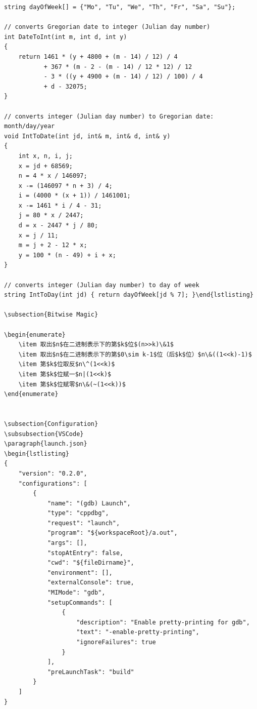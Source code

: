 \documentclass[twoside]{article}
\begin{document}
\begin{lstlisting}
string dayOfWeek[] = {"Mo", "Tu", "We", "Th", "Fr", "Sa", "Su"};

// converts Gregorian date to integer (Julian day number)
int DateToInt(int m, int d, int y)
{
    return 1461 * (y + 4800 + (m - 14) / 12) / 4
           + 367 * (m - 2 - (m - 14) / 12 * 12) / 12
           - 3 * ((y + 4900 + (m - 14) / 12) / 100) / 4
           + d - 32075;
}

// converts integer (Julian day number) to Gregorian date: month/day/year
void IntToDate(int jd, int& m, int& d, int& y)
{
    int x, n, i, j;
    x = jd + 68569;
    n = 4 * x / 146097;
    x -= (146097 * n + 3) / 4;
    i = (4000 * (x + 1)) / 1461001;
    x -= 1461 * i / 4 - 31;
    j = 80 * x / 2447;
    d = x - 2447 * j / 80;
    x = j / 11;
    m = j + 2 - 12 * x;
    y = 100 * (n - 49) + i + x;
}

// converts integer (Julian day number) to day of week
string IntToDay(int jd) { return dayOfWeek[jd % 7]; }\end{lstlisting}

\subsection{Bitwise Magic}

\begin{enumerate}
	\item 取出$n$在二进制表示下的第$k$位$(n>>k)\&1$
	\item 取出$n$在二进制表示下的第$0\sim k-1$位（后$k$位）$n\&((1<<k)-1)$
	\item 第$k$位取反$n\^(1<<k)$
	\item 第$k$位赋一$n|(1<<k)$
	\item 第$k$位赋零$n\&(~(1<<k))$
\end{enumerate}


\subsection{Configuration}
\subsubsection{VSCode}
\paragraph{launch.json}
\begin{lstlisting}
{
    "version": "0.2.0",
    "configurations": [
        {
            "name": "(gdb) Launch",
            "type": "cppdbg",
            "request": "launch",
            "program": "${workspaceRoot}/a.out",
            "args": [],
            "stopAtEntry": false,
            "cwd": "${fileDirname}",
            "environment": [],
            "externalConsole": true,
            "MIMode": "gdb",
            "setupCommands": [
                {
                    "description": "Enable pretty-printing for gdb",
                    "text": "-enable-pretty-printing",
                    "ignoreFailures": true
                }
            ],
            "preLaunchTask": "build"
        }
    ]
}
\end{lstlisting}
\end{document}
